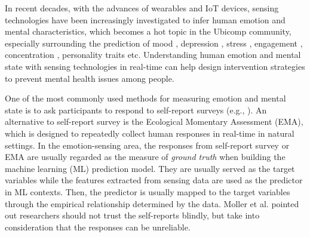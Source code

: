 \documentclass[sigconf]{acmart}
\begin{document}

In recent decades, with the advances of wearables and IoT devices, sensing technologies have been increasingly investigated to infer human emotion and mental characteristics, which becomes a hot topic in the Ubicomp community, especially surrounding the prediction of mood \cite{Moodexplorer,morshed2019prediction}, depression \cite{wang2018trackingdepression,xu2019leveragingdepression}, stress \cite{king2019microstress}, engagement \cite{gao2020n,huynh2018engagemon,di2018engagement}, concentration \cite{rahaman2020ambient}, personality traits \cite{personalitysensing2018wang,gao2019predicting} etc. Understanding human emotion and mental state with sensing technologies in real-time can help design intervention strategies to prevent mental health issues among people. 

One of the most commonly used methods for measuring emotion and mental state is to ask participants to respond to self-report surveys (e.g., \cite{gao2019predicting,di2018engagement,gashi2019using}). An alternative to self-report survey is the Ecological Momentary Assessment (EMA), which is designed to repeatedly collect human responses in real-time in natural settings. In the emotion-sensing area, the responses from self-report survey or EMA are usually regarded as the measure of \textit{ground truth} \cite{king2019microstress,di2018engagement,gao2020n,wang2014studentlife,Moodexplorer} when building the machine learning (ML) prediction model. They are usually served as the target variables while the features extracted from sensing data are used as the predictor in ML contexts. Then, the predictor is usually mapped to the target variables through the empirical relationship determined by the data. Moller et al. \cite{moller2013investigating} pointed out researchers should not trust the self-reports blindly, but take into consideration that the responses can be unreliable.
\end{document}
